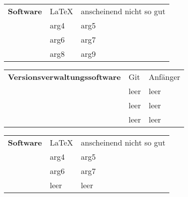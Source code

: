 \documentclass[10pt,a4paper]{article}
\makeatletter
\newcommand{\skillGroup}[9]{
	\noindent
	\begin{tabular*}{\textwidth}{@{}p{6cm}|ll}
		\bfseries #1 & #2 & #3%
		\ifthenelse{\equal{#4}{leer}}{}{\\ & #4 & #5 } %
		\ifthenelse{\equal{#6}{leer}}{}{\\ & #6 & #7 } 
		\ifthenelse{\equal{#8}{leer}}{}{\\ & #8 & #9 } 	
	\end{tabular*}
}
\makeatother
\begin{document}
	
	\noindent
	\blindtext
	
	\skillGroup{Software}{\LaTeX}{anscheinend nicht so gut}{arg4}{arg5}{arg6}{arg7}{arg8}{arg9}
	
	\noindent
	\blindtext
	
	\skillGroup{Versionsverwaltungssoftware}
	{Git}{Anfänger}
	{leer}{leer}
	{leer}{leer}
	{leer}{leer}
	
	\noindent
	\blindtext
	
	\skillGroup{Software}{\LaTeX}{anscheinend nicht so gut}{arg4}{arg5}{arg6}{arg7}{leer}{leer}
	
	\noindent
	\blindtext
	
	
\end{document}
